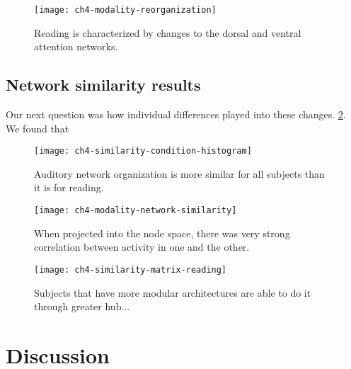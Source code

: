 \begin{figure}[t]
	\centering
	\texttt{[image: ch4-modality-reorganization]}
    \caption[Network-level changes between listening and reading.]{Reading is characterized by changes to the dorsal and ventral attention networks.}
	\label{fig:ch4-modality-reorganization}
\end{figure}

\subsection{Network similarity results}

Our next question was how individual differences played into these changes. 
\ref{fig:ch4-similarity-condition-histogram}. We found that 

\begin{figure}[t]
	\centering
	\texttt{[image: ch4-similarity-condition-histogram]}
    \caption[Auditory network organization is more similar for all subjects than it is for reading.]{Auditory network organization is more similar for all subjects than it is for reading.}
	\label{fig:ch4-similarity-condition-histogram}
\end{figure}


\begin{figure}[t]
	\centering
	\texttt{[image: ch4-modality-network-similarity]}
    \caption[Network similarity between listening and reading predicts word efficiency.]{When projected into the node space, there was very strong correlation between activity in one and the other.}
	\label{fig:ch4-modality-network-similarity}
\end{figure}


\begin{figure}[t]
	\centering
	\texttt{[image: ch4-similarity-matrix-reading]}
    \caption[Diversity of between-network connections predominates on .... ]{Subjects that have more modular architectures are able to do it through greater hub... }
	\label{fig:ch4-modality-network-similarity}
\end{figure}




\section{Discussion}

